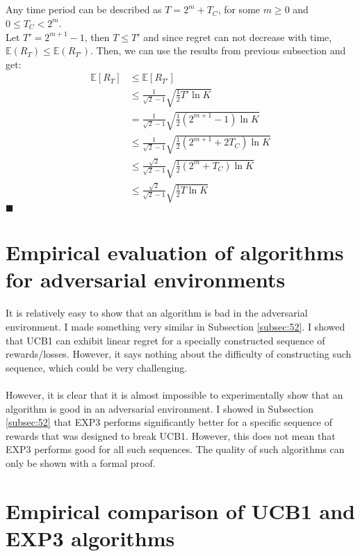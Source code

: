 \documentclass[a4paper]{article}
\newcommand{\expect}[1]{\mathbb{E}\left(#1\right)}
\newcommand*{\QEDA}{\hfill\ensuremath{\blacksquare}}%
\begin{document}
\subsection{}
\label{subsec:32}
Any time period can be described as $T = 2^m + T_C$, for some $m\geq0$ and
$0 \leq T_C < 2^m$. \\
Let $T' = 2^{m+1}-1$, then $T \leq T'$ and since regret can not decrease with time,
$\expect{R_T} \leq \expect{R_{T'}}$.
Then, we can use the results from previous subsection and get:
\begin{align*}
  \mathbb{E}\left[R_{T}\right]&\leq \mathbb{E}\left[R_{T'}\right]\\
  &\leq\frac{1}{\sqrt{2}-1} \sqrt{\frac{1}{2} T' \ln K}\\
  &= \frac{1}{\sqrt{2}-1} \sqrt{\frac{1}{2} (2^{m+1}-1) \ln K}\\
  &\leq\frac{1}{\sqrt{2}-1} \sqrt{\frac{1}{2} (2^{m+1}+2T_C) \ln K} \tag{since $T_C \geq0$}\\
  &\leq\frac{\sqrt{2}}{\sqrt{2}-1} \sqrt{\frac{1}{2} (2^m+T_C) \ln K}\\
  &\leq\frac{\sqrt{2}}{\sqrt{2}-1} \sqrt{\frac{1}{2} T \ln K}
\end{align*}
\QEDA


\section{Empirical evaluation of algorithms for adversarial environments}
\label{sec:4}
It is relatively easy to show that an algorithm is bad in the adversarial
  environment. I made something very similar in Subsection \ref{subsec:52}.
  I showed that UCB1 can exhibit linear regret for a specially constructed
  sequence of rewards/losses. However, it says nothing about the difficulty of
  constructing such sequence, which could be very challenging.\\\\
However, it is clear that it is almost impossible to experimentally show that an
  algorithm is good in an adversarial environment. I showed in Subsection
  \ref{subsec:52} that EXP3 performs significantly better for a specific
  sequence of rewards that was designed to break UCB1. However, this does not
  mean that EXP3 performs good for all such sequences. The quality of such
  algorithms can only be shown with a formal proof.

\section{Empirical comparison of UCB1 and EXP3 algorithms}
\label{sec:5}
\end{document}
